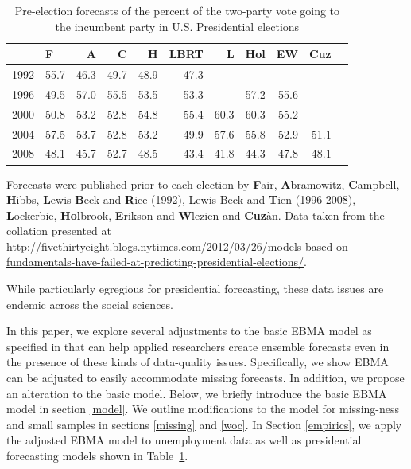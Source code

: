 \documentclass[12pt,fullpage,endnotes]{article}
\begin{document}
\begin{table}[ht]
\caption{Pre-election forecasts of the percent of the two-party vote going to the incumbent party in U.S. Presidential elections}
\label{tab:one}
\footnotesize
\begin{center}
\begin{tabular}{rlrrrrrrrrr}
  \toprule
  & F & A & C & H & LBRT & L & Hol & EW & Cuz \\ 
  \midrule
  1992 & 55.7 & 46.3 & 49.7 & 48.9 & 47.3 &  &  &  &  \\ 
  1996 & 49.5 & 57.0 & 55.5 & 53.5 & 53.3 &  & 57.2 & 55.6 &  \\ 
  2000 & 50.8 & 53.2 & 52.8 & 54.8 & 55.4 & 60.3 & 60.3 & 55.2 &  \\ 
  2004 & 57.5 & 53.7 & 52.8 & 53.2 & 49.9 & 57.6 & 55.8 & 52.9 & 51.1 \\ 
  2008 & 48.1 & 45.7 & 52.7 & 48.5 & 43.4 & 41.8 & 44.3 & 47.8 & 48.1 \\ 
  \bottomrule

\end{tabular}
\end{center}
Forecasts were published prior to each election by \textbf{F}air, \textbf{A}bramowitz, \textbf{C}ampbell, \textbf{H}ibbs, \textbf{L}ewis-\textbf{B}eck and \textbf{R}ice (1992), Lewis-Beck and \textbf{T}ien  (1996-2008),   \textbf{L}ockerbie, \textbf{Hol}brook, \textbf{E}rikson and \textbf{W}lezien and \textbf{Cuz}\`an.  Data taken from the collation presented at \url{http://fivethirtyeight.blogs.nytimes.com/2012/03/26/models-based-on-fundamentals-have-failed-at-predicting-presidential-elections/}.
\end{table}

While particularly egregious for presidential forecasting, these data
issues are endemic across the social sciences.

In this paper, we explore several adjustments to the basic EBMA model
as specified in \citet{mhw:2012} that can help applied
researchers create ensemble forecasts even in the presence of these
kinds of data-quality issues.  Specifically, we show EBMA can be
adjusted to easily accommodate missing forecasts.  In addition, we
propose an alteration to the basic model.  Below, we briefly introduce
the basic EBMA model in section \ref{model}.  We outline modifications
to the model for missing-ness and small samples in sections
\ref{missing} and \ref{woc}. In Section \ref{empirics}, we apply the
adjusted EBMA model to unemployment data as well as presidential
forecasting models shown in Table~\ref{tab:one}.
\end{document}
